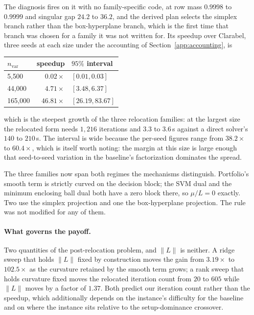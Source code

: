 \documentclass[11pt]{article}
\begin{document}
The diagnosis fires on it with no family-specific code, at row mass $0.9998$
to $0.9999$ and singular gap $24.2$ to $36.2$, and the derived plan selects
the simplex branch rather than the box-hyperplane branch, which is the first
time that branch was chosen for a family it was not written for. Its speedup over
Clarabel, three seeds at each size under the accounting of
Section~\ref{app:accounting}, is

\begin{center}
\begin{tabular}{lrl}
\toprule
$n_{\mathrm{var}}$ & speedup & $95\%$ interval \\
\midrule
5{,}500   & $0.02\times$  & $[0.01, 0.03]$ \\
44{,}000  & $4.71\times$  & $[3.48, 6.37]$ \\
165{,}000 & $46.81\times$ & $[26.19, 83.67]$ \\
\bottomrule
\end{tabular}
\end{center}

which is the steepest growth of the three relocation families: at the largest
size the relocated form needs $1{,}216$ iterations and $3.3$ to $3.6$\,s
against a direct solver's $140$ to $210$\,s. The interval is wide because the
per-seed figures range from $38.2\times$ to $60.4\times$, which is itself
worth noting: the margin at this size is large enough that seed-to-seed
variation in the baseline's factorization dominates the spread.

The three families now span both regimes the mechanisms distinguish.
Portfolio's smooth term is strictly curved on the decision block; the SVM
dual and the minimum enclosing ball dual both have a zero block there, so
$\mu/L = 0$ exactly. Two use the simplex projection and one the
box-hyperplane projection. The rule was not modified for any of them.

\paragraph{What governs the payoff.}
Two quantities of the post-relocation problem, and $\|L\|$ is neither. A
ridge sweep that holds $\|L\|$ fixed by construction moves the gain from
$3.19\times$ to $102.5\times$ as the curvature retained by the smooth term
grows; a rank sweep that holds curvature fixed moves the relocated iteration
count from $20$ to $605$ while $\|L\|$ moves by a factor of $1.37$. Both
predict our iteration count rather than the speedup, which additionally
depends on the instance's difficulty for the baseline and on where the
instance sits relative to the setup-dominance crossover.
\end{document}
